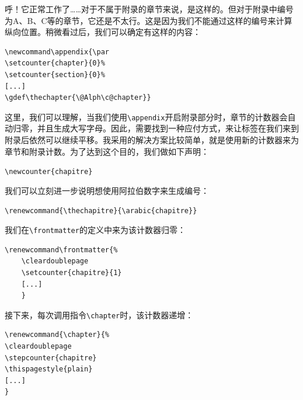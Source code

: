 呼！它正常工作了……对于不属于附录的章节来说，是这样的。但对于附录中编号为A、B、C等的章节，它还是不太行。这是因为我们不能通过这样的编号来计算纵向位置。稍微看过后，我们可以确定有这样的内容：

\begin{dmd}
\begin{verbatim}
\newcommand\appendix{\par 
\setcounter{chapter}{0}% 
\setcounter{section}{0}%
[...] 
\gdef\thechapter{\@Alph\c@chapter}}\end{verbatim}
\end{dmd}

这里，我们可以理解，当我们使用\verb|\appendix|开启附录部分时，章节的计数器会自动归零，并且生成大写字母。因此，需要找到一种应付方式，来让标签在我们来到附录后依然可以继续平移。我采用的解决方案比较简单，就是使用新的计数器来为章节和附录计数。为了达到这个目的，我们做如下声明：

\begin{dmd}
\verb|\newcounter{chapitre}|
\end{dmd}

我们可以立刻进一步说明想使用阿拉伯数字来生成编号：

\begin{dmd}
\verb|\renewcommand{\thechapitre}{\arabic{chapitre}}|
\end{dmd}

我们在\verb+\frontmatter+的定义中来为该计数器归零：

\begin{dmd}
\begin{verbatim}
\renewcommand\frontmatter{% 
    \cleardoublepage 
    \setcounter{chapitre}{1} 
    [...]
    }\end{verbatim}
\end{dmd}

接下来，每次调用指令\verb|\chapter|时，该计数器递增：

\begin{dmd}
\begin{verbatim}
\renewcommand{\chapter}{% 
\cleardoublepage 
\stepcounter{chapitre} 
\thispagestyle{plain} 
[...]
}\end{verbatim}
\end{dmd}

